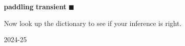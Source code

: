 \documentclass[11pt,a4paper]{article}
\begin{document}
\begin{flushleft}
    \vspace{1em}
    
    \noindent
    \colorbox{pink-bg}{%
        \begin{minipage}{\dimexpr\linewidth-2\fboxsep}
            \vspace{0.5em}
            \quad {\color{magenta-text}$\blacksquare$} \hfill \textbf{paddling} \hfill \textbf{transient} \hfill {\color{magenta-text}$\blacksquare$} \quad
            \vspace{0.5em}
        \end{minipage}%
    }
    
    \vspace{1.5em}
    
    \noindent Now look up the dictionary to see if your inference is right.
\end{flushleft}

\vfill

\begin{center}
    \small 2024-25
\end{center}
\end{document}
